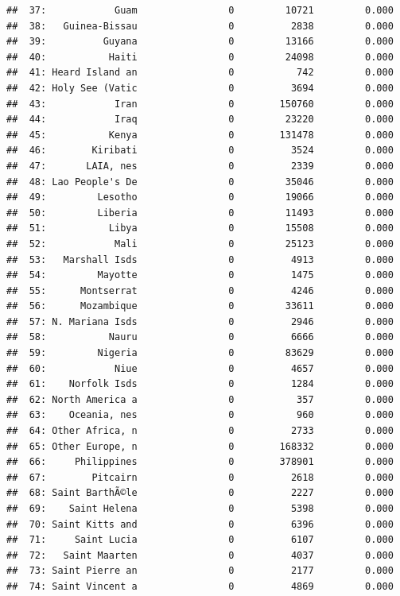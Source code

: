 \documentclass[10pt,]{article}
\begin{document}
\begin{verbatim}
##  37:            Guam                0         10721         0.000
##  38:   Guinea-Bissau                0          2838         0.000
##  39:          Guyana                0         13166         0.000
##  40:           Haiti                0         24098         0.000
##  41: Heard Island an                0           742         0.000
##  42: Holy See (Vatic                0          3694         0.000
##  43:            Iran                0        150760         0.000
##  44:            Iraq                0         23220         0.000
##  45:           Kenya                0        131478         0.000
##  46:        Kiribati                0          3524         0.000
##  47:       LAIA, nes                0          2339         0.000
##  48: Lao People's De                0         35046         0.000
##  49:         Lesotho                0         19066         0.000
##  50:         Liberia                0         11493         0.000
##  51:           Libya                0         15508         0.000
##  52:            Mali                0         25123         0.000
##  53:   Marshall Isds                0          4913         0.000
##  54:         Mayotte                0          1475         0.000
##  55:      Montserrat                0          4246         0.000
##  56:      Mozambique                0         33611         0.000
##  57: N. Mariana Isds                0          2946         0.000
##  58:           Nauru                0          6666         0.000
##  59:         Nigeria                0         83629         0.000
##  60:            Niue                0          4657         0.000
##  61:    Norfolk Isds                0          1284         0.000
##  62: North America a                0           357         0.000
##  63:    Oceania, nes                0           960         0.000
##  64: Other Africa, n                0          2733         0.000
##  65: Other Europe, n                0        168332         0.000
##  66:     Philippines                0        378901         0.000
##  67:        Pitcairn                0          2618         0.000
##  68: Saint BarthÃ©le                0          2227         0.000
##  69:    Saint Helena                0          5398         0.000
##  70: Saint Kitts and                0          6396         0.000
##  71:     Saint Lucia                0          6107         0.000
##  72:   Saint Maarten                0          4037         0.000
##  73: Saint Pierre an                0          2177         0.000
##  74: Saint Vincent a                0          4869         0.000

\end{verbatim}
\end{document}
